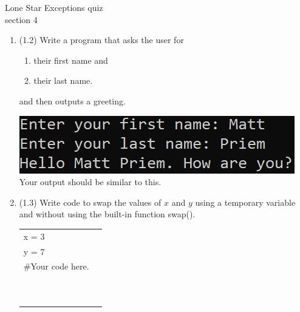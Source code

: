 \documentclass{article}
\begin{document}

Lone Star \hfill Exceptions quiz\\
section 4\\
\begin{enumerate}
\item (1.2) 
		Write a program that asks the user for \\
		\begin{minipage}{0.5\textwidth}
		\vspace*{-0.5em}
			\begin{enumerate}  \setlength\itemsep{-0.3em}
				\item their first name and
				\item their last name.  
			\end{enumerate} \vspace*{-1ex}
		and then outputs a greeting.
		\end{minipage}
		\begin{minipage}{0.5\textwidth}
			\centering
			\includegraphics[scale=0.9]{./imgs/outputGreeting.png}\\
			Your output should be similar to this.
		\end{minipage}


\item (1.3) 
		Write code to swap the values of $x$ and $y$ using a temporary variable and without using
		the built-in function swap().\\		
		\begin{tabular}{|ll}
			\\			
			x = 3\\
			y = 7\\[5pt]
			\#Your code here. \\[5pt]
			& \\ & \\ & \\ & \\ & \\ & \\ & \\ & \\ & \\ & \\ 
		\end{tabular}



\end{enumerate}
\end{document}

